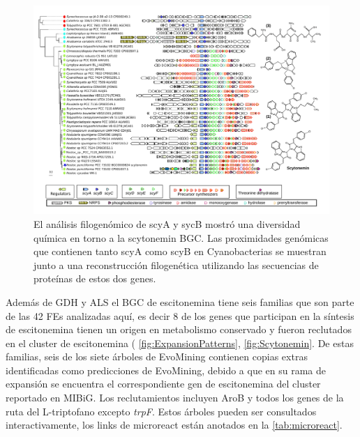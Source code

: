 \documentclass[12pt,twoside]{reedthesis}
\begin{document}
  \begin{figure}[h!tbp]
  \centering
  \includegraphics[angle = 90,scale = .8]{chapter2/FigurasPaper/Figure7.pdf}
  \caption[El cluster de scytonemina produce distintos metabolitos]{\footnotesize{El análisis filogenómico de scyA y sycB mostró una diversidad química en torno a la scytonemin BGC. Las proximidades genómicas que contienen tanto scyA como scyB en Cyanobacterias se muestran junto a una reconstrucción filogenética utilizando las secuencias de proteínas de estos dos genes.}}
  \label{fig:CorasonScytonemina}
  \end{figure}
  
  Además de GDH y ALS el BGC de escitonemina tiene seis familias que son
  parte de las 42 FEs analizadas aquí, es decir 8 de los genes que
  participan en la síntesis de escitonemina tienen un origen en
  metabolismo conservado y fueron reclutados en el cluster de escitonemina
  ( \autoref{fig:ExpansionPatterns}, \autoref{fig:Scytonemin}. De estas
  familias, seis de los siete árboles de EvoMining contienen copias extras
  identificadas como predicciones de EvoMining, debido a que en su rama de
  expansión se encuentra el correspondiente gen de escitonemina del
  cluster reportado en MIBiG. Los reclutamientos incluyen AroB y todos los
  genes de la ruta del L-triptofano excepto \emph{trpF}. Estos árboles
  pueden ser consultados interactivamente, los links de microreact están
  anotados en la \autoref{tab:microreact}.
  
\end{document}
